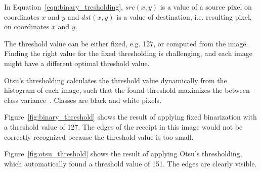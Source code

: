 \documentclass[
  digital, %
  table,   %
  oneside, %
  lof,     %
  lot,     %
]{fithesis3}
\begin{document}
\begin{enumerate}
    In Equation~\ref{eqn:binary_tresholding}, $src(x,y)$ is a value of a source pixel on coordinates $x$ and $y$ and $dst(x,y)$ is a value of destination, i.e. resulting pixel, on coordinates $x$ and $y$.
    
    The threshold value can be either fixed, e.g. 127, or computed from the image. Finding the right value for the fixed thresholding is challenging, and each image might have a different optimal threshold value.
    
    Otsu's thresholding calculates the threshold value dynamically from the histogram of each image, such that the found threshold maximizes the between-class variance~\cite{Gonzalez2008Digital}. Classes are black and white pixels.
    
    Figure~\ref{fig:binary_threshold} shows the result of applying fixed binarization with a threshold value of 127. The edges of the receipt in this image would not be correctly recognized because the threshold value is too small.
    
    Figure~\ref{fig:otsu_threshold} shows the result of applying Otsu's thresholding, which automatically found a threshold value of 151. The edges are clearly visible.
    

\end{enumerate}
\end{document}
